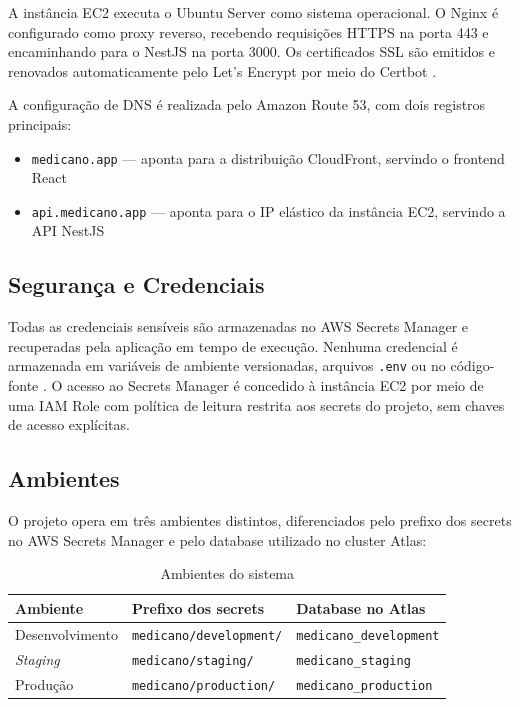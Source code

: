 A instância EC2 executa o Ubuntu Server como
sistema operacional. O Nginx é configurado como
proxy reverso, recebendo requisições HTTPS na
porta 443 e encaminhando para o NestJS na porta
3000. Os certificados SSL são emitidos e renovados
automaticamente pelo Let's Encrypt por meio do
Certbot \cite{reese2008}.

A configuração de DNS é realizada pelo Amazon
Route 53, com dois registros principais:

\begin{itemize}
  \item \texttt{medicano.app} --- aponta para a
        distribuição CloudFront, servindo o
        frontend React
  \item \texttt{api.medicano.app} --- aponta para
        o IP elástico da instância EC2, servindo
        a API NestJS
\end{itemize}

\subsection{Segurança e Credenciais}
\label{subsec:security}

Todas as credenciais sensíveis são armazenadas no
AWS Secrets Manager e recuperadas pela aplicação
em tempo de execução. Nenhuma credencial é
armazenada em variáveis de ambiente versionadas,
arquivos \texttt{.env} ou no código-fonte
\cite{awssm}. O acesso ao Secrets Manager é
concedido à instância EC2 por meio de uma IAM
Role com política de leitura restrita aos secrets
do projeto, sem chaves de acesso explícitas.

\subsection{Ambientes}
\label{subsec:environments}

O projeto opera em três ambientes distintos,
diferenciados pelo prefixo dos secrets no
AWS Secrets Manager e pelo database utilizado
no cluster Atlas:

\begin{table}[H]
  \centering
  \caption{Ambientes do sistema}
  \label{tab:environments}
  \begin{tabular}{p{2.5cm}p{3.5cm}p{5cm}}
    \toprule
    \textbf{Ambiente} &
    \textbf{Prefixo dos secrets} &
    \textbf{Database no Atlas} \\
    \midrule
    Desenvolvimento
      & \texttt{medicano/development/}
      & \texttt{medicano\_development} \\
    \textit{Staging}
      & \texttt{medicano/staging/}
      & \texttt{medicano\_staging} \\
    Produção
      & \texttt{medicano/production/}
      & \texttt{medicano\_production} \\
    \bottomrule
  \end{tabular}
\end{table}

